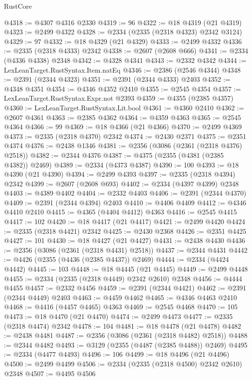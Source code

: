 \begin{lexlean}{RustCore}
\begin{coremodule}
@4318 := @4307 @4316 @2330
@4319 := 96
@4322 := @18 @4319 (@21 @4319)
@4323 := @2499 @4322
@4328 := @2334 (@2335 (@2318 @4323) @2342 @3124)
@4329 := 97
@4332 := @18 @4329 (@21 @4329)
@4333 := @2499 @4332
@4336 := @2335 (@2318 @4333) @2342
@4338 := @2607 (@2608 @666)
@4341 := @2334 (@4336 @4338) @2348
@4342 := @4328 @4341
@4343 := @2332 @4342
@4344 := LexLeanTarget.RustSyntax.Item.natEq
@4346 := @2386 (@2546 @4344)
@4348 := @2391 (@2344 @4323)
@4351 := @2391 (@2344 @4333) @2403
@4352 := @4348 @4351
@4354 := @4346 @4352 @2410
@4355 := @2545 @4354
@4357 := LexLeanTarget.RustSyntax.Expr.not @2393
@4359 := @4355 (@2385 @4357)
@4360 := LexLeanTarget.RustSyntax.Lit.bool
@4361 := @4360 @2410
@4362 := @2607 @4361
@4363 := @2385 @4362
@4364 := @4359 @4363
@4365 := @2545 @4364
@4366 := 99
@4369 := @18 @4366 (@21 @4366)
@4370 := @2499 @4369
@4373 := @2335 (@2318 @4370) @2342
@4374 := @2430 @2371
@4375 := @2351 @4374
@4376 := @2438 @1346
@4381 := @2356 (@3086 (@2361 (@2318 @4376) @2518))
@4382 := @2344 @4376
@4387 := @4375 (@2355 (@4381 (@2385 @4382)) @2469)
@4389 := @2334 (@4373 @4387)
@4390 := 100
@4393 := @18 @4390 (@21 @4390)
@4394 := @2499 @4393
@4397 := @2335 (@2318 @4394) @2342
@4399 := @2607 (@2608 @693)
@4402 := @2334 (@4397 @4399) @2348
@4403 := @4389 @4402
@4404 := @2332 @4403
@4406 := @2391 (@2344 @4370)
@4409 := @2391 (@2344 @4394) @2403
@4410 := @4406 @4409
@4412 := @4346 @4410 @2410
@4415 := @4365 (@4404 @4412) @4363
@4416 := @2545 @4415
@4417 := 102
@4420 := @18 @4417 (@21 @4417)
@4421 := @2499 @4420
@4424 := @2335 (@2318 @4421) @2342
@4425 := @2430 @2368
@4426 := @2351 @4425
@4427 := 101
@4430 := @18 @4427 (@21 @4427)
@4431 := @2438 @4430
@4436 := @2356 (@3086 (@2361 (@2318 @4431) @2518))
@4437 := @2344 @4431
@4442 := @4426 (@2355 (@4436 (@2385 @4437)) @2469)
@4444 := @2334 (@4424 @4442)
@4445 := 103
@4448 := @18 @4445 (@21 @4445)
@4449 := @2499 @4448
@4455 := @2334 (@2335 (@2318 @4449) @2342 @2610) @2348
@4456 := @4444 @4455
@4457 := @2332 @4456
@4459 := @2391 (@2344 @4421)
@4462 := @2391 (@2344 @4449) @2403
@4463 := @4459 @4462
@4465 := @4346 @4463 @2410
@4468 := @4416 (@4457 @4465) @4363
@4469 := @2545 @4468
@4470 := 105
@4473 := @18 @4470 (@21 @4470)
@4474 := @2499 @4473
@4477 := @2335 (@2318 @4474) @2342
@4478 := 104
@4481 := @18 @4478 (@21 @4478)
@4482 := @2438 @4481
@4487 := @2356 (@3086 (@2361 (@2318 @4482) @2518))
@4488 := @2344 @4482
@4493 := @3129 (@2355 (@4487 (@2385 @4488)) @2469)
@4495 := @2334 (@4477 @4493)
@4496 := 106
@4499 := @18 @4496 (@21 @4496)
@4500 := @2499 @4499
@4506 := @2334 (@2335 (@2318 @4500) @2342 @2610) @2348
@4507 := @4495 @4506

\end{coremodule}
\end{lexlean}
